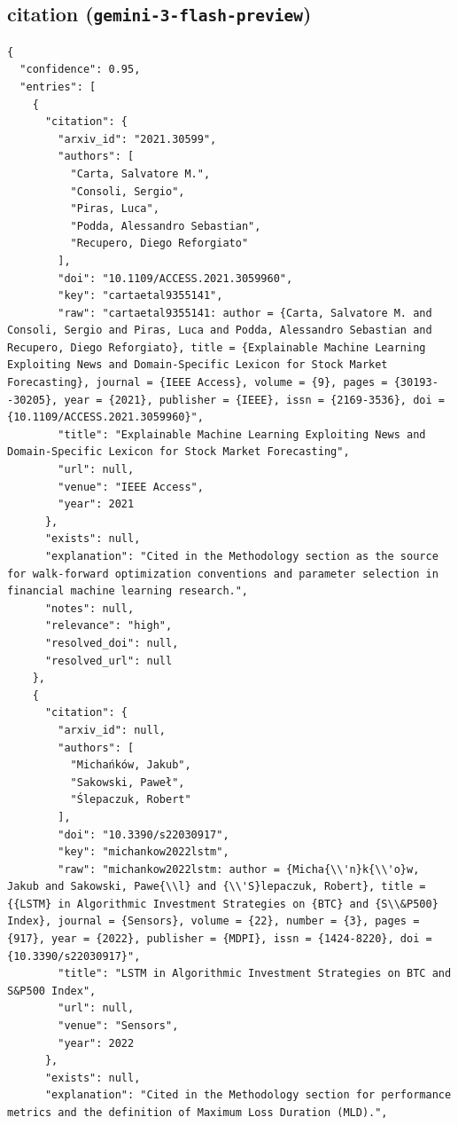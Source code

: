\documentclass[11pt]{article}
\begin{document}
\subsection*{citation (\texttt{gemini-3-flash-preview})}
\begin{verbatim}
{
  "confidence": 0.95,
  "entries": [
    {
      "citation": {
        "arxiv_id": "2021.30599",
        "authors": [
          "Carta, Salvatore M.",
          "Consoli, Sergio",
          "Piras, Luca",
          "Podda, Alessandro Sebastian",
          "Recupero, Diego Reforgiato"
        ],
        "doi": "10.1109/ACCESS.2021.3059960",
        "key": "cartaetal9355141",
        "raw": "cartaetal9355141: author = {Carta, Salvatore M. and Consoli, Sergio and Piras, Luca and Podda, Alessandro Sebastian and Recupero, Diego Reforgiato}, title = {Explainable Machine Learning Exploiting News and Domain-Specific Lexicon for Stock Market Forecasting}, journal = {IEEE Access}, volume = {9}, pages = {30193--30205}, year = {2021}, publisher = {IEEE}, issn = {2169-3536}, doi = {10.1109/ACCESS.2021.3059960}",
        "title": "Explainable Machine Learning Exploiting News and Domain-Specific Lexicon for Stock Market Forecasting",
        "url": null,
        "venue": "IEEE Access",
        "year": 2021
      },
      "exists": null,
      "explanation": "Cited in the Methodology section as the source for walk-forward optimization conventions and parameter selection in financial machine learning research.",
      "notes": null,
      "relevance": "high",
      "resolved_doi": null,
      "resolved_url": null
    },
    {
      "citation": {
        "arxiv_id": null,
        "authors": [
          "Michańków, Jakub",
          "Sakowski, Paweł",
          "Ślepaczuk, Robert"
        ],
        "doi": "10.3390/s22030917",
        "key": "michankow2022lstm",
        "raw": "michankow2022lstm: author = {Micha{\\'n}k{\\'o}w, Jakub and Sakowski, Pawe{\\l} and {\\'S}lepaczuk, Robert}, title = {{LSTM} in Algorithmic Investment Strategies on {BTC} and {S\\&P500} Index}, journal = {Sensors}, volume = {22}, number = {3}, pages = {917}, year = {2022}, publisher = {MDPI}, issn = {1424-8220}, doi = {10.3390/s22030917}",
        "title": "LSTM in Algorithmic Investment Strategies on BTC and S&P500 Index",
        "url": null,
        "venue": "Sensors",
        "year": 2022
      },
      "exists": null,
      "explanation": "Cited in the Methodology section for performance metrics and the definition of Maximum Loss Duration (MLD).",

\end{verbatim}
\end{document}
